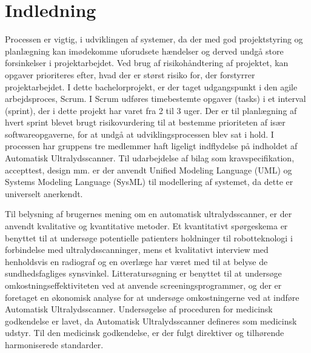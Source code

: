 \chapter{Indledning}\label{kapInd}
Processen er vigtig, i udviklingen af systemer, da der med god projektstyring og planlægning kan imødekomme uforudsete hændelser og derved undgå store forsinkelser i projektarbejdet. Ved brug af risikohåndtering af projektet, kan opgaver prioriteres efter, hvad der er størst risiko for, der forstyrrer projektarbejdet. I dette bachelorprojekt, er der taget udgangspunkt i den agile arbejdsproces, Scrum. I Scrum udføres timebestemte opgaver (tasks) i et interval (sprint), der i dette projekt har varet fra 2 til 3 uger. Der er til planlægning af hvert sprint blevet brugt risikovurdering til at bestemme prioriteten af især softwareopgaverne, for at undgå at udviklingsprocessen blev sat i hold. 
I processen har gruppens tre medlemmer haft ligeligt indflydelse på indholdet af Automatisk Ultralydsscanner. Til udarbejdelse af bilag som kravspecifikation, accepttest, design mm. er der anvendt Unified Modeling Language (UML) og Systems Modeling Language (SysML) til modellering af systemet, da dette er universelt anerkendt.

Til belysning af brugernes mening om en automatisk ultralydsscanner, er der anvendt kvalitative og kvantitative metoder. Et kvantitativt spørgeskema er benyttet til at undersøge potentielle patienters
holdninger til robotteknologi i forbindelse med ultralydsscanninger, mens et kvalitativt
interview med henholdsvis en radiograf og en overlæge har været med til at belyse de sundhedsfagliges
synsvinkel. Litteratursøgning er benyttet til at undersøge omkostningseffektiviteten ved at anvende screeningsprogrammer, og der er foretaget en økonomisk analyse for at undersøge omkostningerne ved at indføre Automatisk Ultralydsscanner. Undersøgelse af proceduren for medicinsk godkendelse er lavet, da Automatisk Ultralydsscanner defineres som medicinsk udstyr. Til den medicinsk godkendelse, er der fulgt direktiver og tilhørende harmoniserede standarder. 



